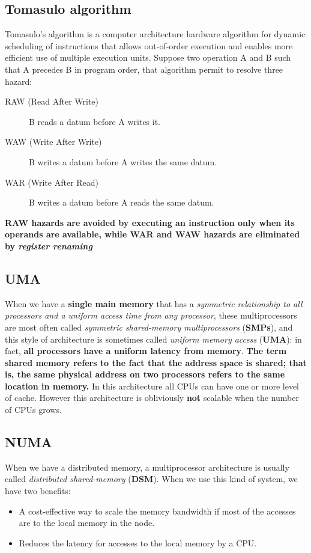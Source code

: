 \documentclass[10pt,a4paper]{article}
\begin{document}
\subsection{Tomasulo algorithm}

Tomasulo’s algorithm is a computer architecture hardware algorithm for dynamic scheduling of instructions that allows out-of-order execution and enables more efficient use of multiple execution units. Suppose two operation A and B such that A precedes B in program order, that algorithm permit to resolve three hazard:

\begin{description}
\item[RAW (Read After Write)] B reads a datum before A writes it.
\item[WAW (Write After Write)] B writes a datum before A writes the same datum.
\item[WAR (Write After Read)] B writes a datum before A reads the same datum.
\end{description}

\textbf{RAW hazards are avoided by executing an instruction only when its operands are available, while WAR and WAW hazards are eliminated by \textit{register renaming}}

\subsection{UMA}

When we have a \textbf{single main memory} that has a \textit{symmetric relationship to all processors and a uniform access time from any processor}, these multiprocessors are most often called \textit{symmetric shared-memory multiprocessors} (\textbf{SMPs}), and this style of architecture is sometimes called \textit{uniform memory access} (\textbf{UMA}): in fact, \textbf{all processors have a uniform latency from memory}. \textbf{The term shared memory refers to the fact that the address space is shared; that is, the same physical address on two processors refers to the same location in memory.} In this architecture all CPUs can have one or more level of cache. However this architecture is obliviously \textbf{not} scalable when the number of CPUs grows.

\subsection{NUMA}

When we have a distributed memory, a multiprocessor architecture is usually called \textit{distributed shared-memory} (\textbf{DSM}). When we use this kind of system, we have two benefits:
\begin{itemize}
\item A cost-effective way to scale the memory bandwidth if most of the accesses are to the local memory in the node.
\item Reduces the latency for accesses to the local memory by a CPU.
\end{itemize}
\end{document}
